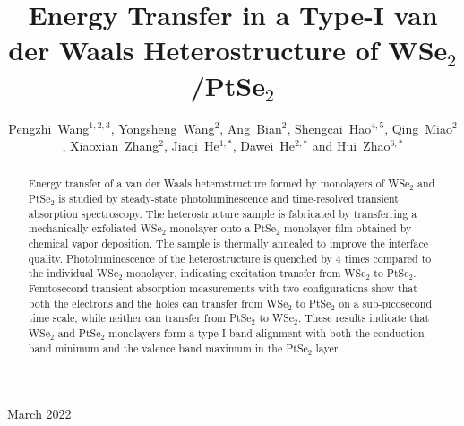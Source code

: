 \documentclass[10pt]{iopart}
\begin{document}
\title[]{Energy Transfer in a Type-I van der Waals Heterostructure of WSe$_2$/PtSe$_2$}

\author{Pengzhi~Wang$^{1,2,3}$,
                Yongsheng~Wang$^{2}$,
                Ang~Bian$^{2}$,
				Shengcai~Hao$^{4,5}$,
                Qing~Miao$^{2}$,
                Xiaoxian~Zhang$^{2}$,
                Jiaqi~He$^{1,*}$,
                Dawei~He$^{2,*}$ and Hui~Zhao$^{6,*}$}
\address{$^{1}$College of Mathematics and Physics\unskip, Beijing University of Chemical Technology\unskip, Beijing\unskip, 100029\unskip, China}
\address{$^{2}$Key Laboratory of Luminescence and Optical Information, Ministry of Education, Institute of Optoelectronic Technology\unskip, Beijing Jiaotong University\unskip, Beijing\unskip, 100044\unskip, China}
\address{$^{3}$GBA branch of Aerospace Information Research Institute\unskip, Chinese Academy of Sciences\unskip,  Guangzhou\unskip, 510700\unskip, China}
\address{$^{4}$Beijing Institute of Electro-machining Co.,Ltd.\unskip, Beijing Key Laboratory of Electro Discharge Machining Technology\unskip, Beijing\unskip, 100191\unskip, China}
\address{$^{5}$Beijing Academy of Science and Technology\unskip, Beijing\unskip, 100089\unskip, China}
\address{$^{6}$Department of Physics and Astronomy\unskip, The University of Kansas\unskip, Lawrence\unskip, Kansas\unskip, 66045\unskip, USA}

\vspace{10pt}
\begin{indented}
\item[]March 2022
\end{indented}

\begin{abstract}
Energy transfer of a van der Waals heterostructure formed by monolayers of WSe$_2$ and PtSe$_2$ is studied by steady-state photoluminescence and time-resolved transient absorption spectroscopy. The heterostructure sample is fabricated by transferring a mechanically exfoliated WSe$_2$ monolayer onto a PtSe$_2$ monolayer film obtained by chemical vapor deposition. The sample is thermally annealed to improve the interface quality. Photoluminescence of the heterostructure is quenched by 4 times compared to the individual WSe$_2$ monolayer, indicating excitation transfer from WSe$_2$ to PtSe$_2$. Femtosecond transient absorption measurements with two configurations show that both the electrons and the holes can transfer from WSe$_2$ to PtSe$_2$ on a sub-picosecond time scale, while neither can transfer from PtSe$_2$ to WSe$_2$. These results indicate that WSe$_2$ and PtSe$_2$ monolayers form a type-I band alignment with both the conduction band minimum and the valence band maximum in the PtSe$_2$ layer. 
\end{abstract}
\end{document}

